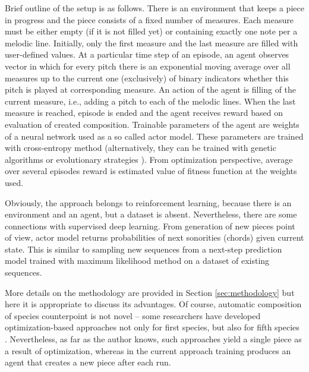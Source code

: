 \documentclass{article}
\begin{document}
Brief outline of the setup is as follows. There is an environment that keeps a piece in progress and the piece consists of a fixed number of measures. Each measure must be either empty (if it is not filled yet) or containing exactly one note per a melodic line. Initially, only the first measure and the last measure are filled with user-defined values. At a particular time step of an episode, an agent observes vector in which for every pitch there is an exponential moving average over all measures up to the current one (exclusively) of binary indicators whether this pitch is played at corresponding measure. An action of the agent is filling of the current measure, i.e., adding a pitch to each of the melodic lines. When the last measure is reached, episode is ended and the agent receives reward based on evaluation of created composition. Trainable parameters of the agent are weights of a neural network used as a so called actor model. These parameters are trained with cross-entropy method \cite{rubinstein1997optimization} (alternatively, they can be trained with genetic algorithms or evolutionary strategies \cite{salimans2017evolution}). From optimization perspective, average over several episodes reward is estimated value of fitness function at the weights used.

Obviously, the approach belongs to reinforcement learning, because there is an environment and an agent, but a dataset is absent. Nevertheless, there are some connections with supervised deep learning. From generation of new pieces point of view, actor model returns probabilities of next sonorities (chords) given current state. This is similar to sampling new sequences from a next-step prediction model trained with maximum likelihood method on a dataset of existing sequences.

More details on the methodology are provided in Section \ref{sec:methodology} but here it is appropriate to discuss its advantages. Of course, automatic composition of species counterpoint is not novel -- some researchers have developed optimization-based approaches not only for first species, but also for fifth species \cite{herremans2012composing}. Nevertheless, as far as the author knows, such approaches yield a single piece as a result of optimization, whereas in the current approach training produces an agent that creates a new piece after each run.
\end{document}
